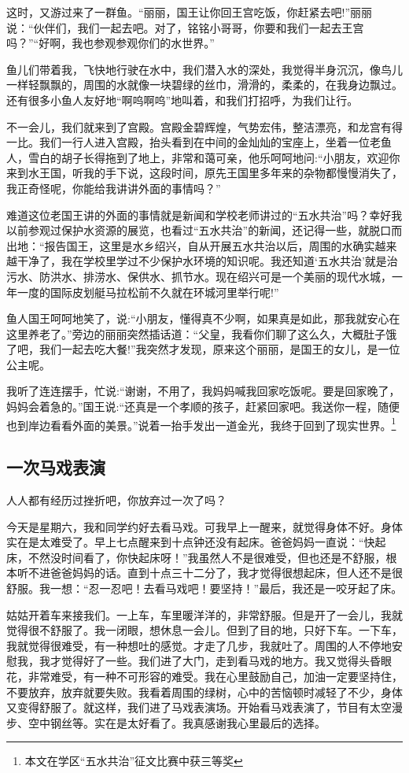 \documentclass[UTF8,a4paper,titlepage,twoside,10.5pt]{article}
\begin{document}
这时，又游过来了一群鱼。“丽丽，国王让你回王宫吃饭，你赶紧去吧!”丽丽说：“伙伴们，我们一起去吧。对了，铭铭小哥哥，你要和我们一起去王宫吗？”“好啊，我也参观参观你们的水世界。”

鱼儿们带着我，飞快地行驶在水中，我们潜入水的深处，我觉得半身沉沉，像鸟儿一样轻飘飘的，周围的水就像一块碧绿的丝巾，滑滑的，柔柔的，在我身边飘过。还有很多小鱼人友好地“啊呜啊呜”地叫着，和我们打招呼，为我们让行。

不一会儿，我们就来到了宫殿。宫殿金碧辉煌，气势宏伟，整洁漂亮，和龙宫有得一比。我们一行人进入宫殿，抬头看到在中间的金灿灿的宝座上，坐着一位老鱼人，雪白的胡子长得拖到了地上，非常和蔼可亲，他乐呵呵地问:“小朋友，欢迎你来到水王国，听我的手下说，这段时间，原先王国里多年来的杂物都慢慢消失了，我正奇怪呢，你能给我讲讲外面的事情吗？”

难道这位老国王讲的外面的事情就是新闻和学校老师讲过的“五水共治”吗？幸好我以前参观过保护水资源的展览，也看过“五水共治”的新闻，还记得一些，就脱口而出地：“报告国王，这里是水乡绍兴，自从开展五水共治以后，周围的水确实越来越干净了，我在学校里学过不少保护水环境的知识呢。我还知道‘五水共治’就是治污水、防洪水、排涝水、保供水、抓节水。现在绍兴可是一个美丽的现代水城，一年一度的国际皮划艇马拉松前不久就在环城河里举行呢!”

鱼人国王呵呵地笑了，说:“小朋友，懂得真不少啊，如果真是如此，那我就安心在这里养老了。”旁边的丽丽突然插话道：“父皇，我看你们聊了这么久，大概肚子饿了吧，我们一起去吃大餐!”我突然才发现，原来这个丽丽，是国王的女儿，是一位公主呢。

我听了连连摆手，忙说:“谢谢，不用了，我妈妈喊我回家吃饭呢。要是回家晚了，妈妈会着急的。”国王说:“还真是一个孝顺的孩子，赶紧回家吧。我送你一程，随便也到岸边看看外面的美景。”说着一抬手发出一道金光，我终于回到了现实世界。\footnote{本文在学区“五水共治”征文比赛中获三等奖}

\subsection{一次马戏表演}
\label{sec:orgfbe33f5}

人人都有经历过挫折吧，你放弃过一次了吗？

今天是星期六，我和同学约好去看马戏。可我早上一醒来，就觉得身体不好。身体实在是太难受了。早上七点醒来到十点钟还没有起床。爸爸妈妈一直说：“快起床，不然没时间看了，你快起床呀！”我虽然人不是很难受，但也还是不舒服，根本听不进爸爸妈妈的话。直到十点三十二分了，我才觉得很想起床，但人还不是很舒服。我一想：“忍一忍吧！去看马戏吧！要坚持！”最后，我还是一咬牙起了床。

姑姑开着车来接我们。一上车，车里暖洋洋的，非常舒服。但是开了一会儿，我就觉得很不舒服了。我一闭眼，想休息一会儿。但到了目的地，只好下车。一下车，我就觉得很难受，有一种想吐的感觉。才走了几步，我就吐了。周围的人不停地安慰我，我才觉得好了一些。我们进了大门，走到看马戏的地方。我又觉得头昏眼花，非常难受，有一种不可形容的难受。我在心里鼓励自己，加油一定要坚持住，不要放弃，放弃就要失败。我看着周围的绿树，心中的苦恼顿时减轻了不少，身体又变得舒服了。就这样，我们进了马戏表演场。开始看马戏表演了，节目有太空漫步、空中钢丝等。实在是太好看了。我真感谢我心里最后的选择。
\end{document}
